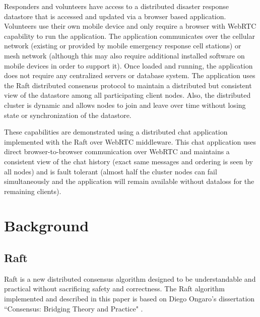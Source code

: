\documentclass[conference,compsoc]{./IEEEtran/IEEEtran}
\begin{document}
Responders and volunteers have access to a distributed disaster response datastore that is accessed and updated via a browser based application. Volunteers use their own mobile device and only require a browser with WebRTC capability to run the application. The application communicates over the cellular network (existing or provided by mobile emergency response cell stations) or mesh network (although this may also require additional installed software on mobile devices in order to support it). Once loaded and running, the application does not require any centralized servers or database system. The application uses the Raft distributed consensus protocol to maintain a distributed but consistent view of the datastore among all participating client nodes. Also, the distributed cluster is dynamic and allows nodes to join and leave over time without losing state or synchronization of the datastore.

These capabilities are demonstrated using a distributed chat application implemented with the Raft over WebRTC middleware. This chat application uses direct browser-to-browser communication over WebRTC and maintains a consistent view of the chat history (exact same messages and ordering is seen by all nodes) and is fault tolerant (almost half the cluster nodes can fail simultaneously and the application will remain available without dataloss for the remaining clients).

\section{Background}

\subsection{Raft}

Raft is a new distributed consensus algorithm designed to be understandable and practical without sacrificing safety and correctness. The Raft algorithm implemented and described in this paper is based on Diego Ongaro's dissertation ``Consensus: Bridging Theory and Practice" \cite{raft_thesis:ongaro14}.
\end{document}
